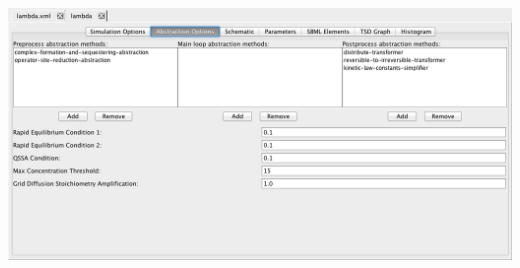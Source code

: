 \documentclass[titlepage,11pt]{article}
\begin{document}
\begin{center}
\includegraphics[width=160mm]{screenshots/absOptions}
\end{center}

\end{document}
